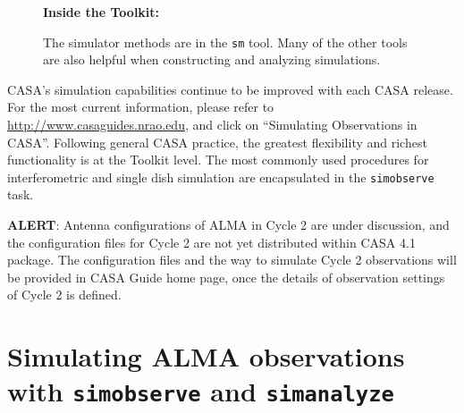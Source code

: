 \begin{wrapfigure}{r}{2.5in}
 \begin{boxedminipage}{2.5in}
    \centerline{\bf Inside the Toolkit:}
    The simulator methods are in the {\tt sm} tool.
    Many of the other tools are also helpful when
    constructing and analyzing simulations.
 \end{boxedminipage}
\end{wrapfigure}

CASA's simulation capabilities continue to be improved with each CASA release.
For the most current information, please refer to
\url{http://www.casaguides.nrao.edu}, and click on
``Simulating Observations in CASA''.
%
Following general CASA practice, the greatest flexibility and richest
functionality is at the Toolkit level.  The most commonly used
procedures for interferometric and single dish simulation are
encapsulated in the {\tt simobserve} task.

{\bf ALERT}: 
Antenna configurations of ALMA in Cycle 2 are under discussion, and
the configuration files for Cycle 2 are not yet distributed within
CASA 4.1 package. The configuration files and the way to simulate
Cycle 2 observations will be provided in CASA Guide home page, once
the details of observation settings of Cycle 2 is defined. 


\section{Simulating ALMA observations with {\tt simobserve} and {\tt simanalyze}}
\label{section:sim.almasimmos}

